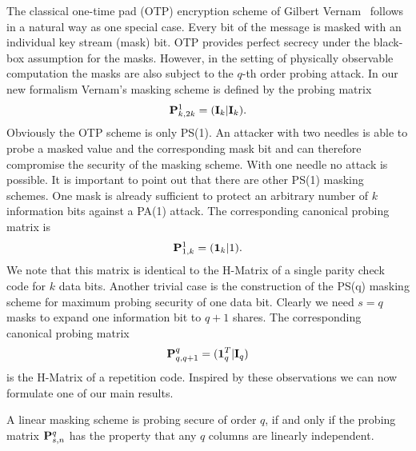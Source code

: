 \documentclass[11pt]{llncs}
\begin{document}
The classical one-time pad (OTP) encryption scheme of
Gilbert Vernam~\cite{Vernam1919SecretSignalingSystem}
follows in a natural way as one special case.
Every bit of the message is masked with an individual key stream (mask) bit.
OTP provides perfect secrecy under the black-box assumption for the masks.
However, in the setting of physically observable computation the masks
are also subject to the $q$-th order probing attack.
In our new formalism Vernam's masking scheme is defined by the probing matrix
\[
    \mathbf{P}^1_{k,2k} = (\mathbf{I}_k | \mathbf{I}_k).
\]
Obviously the OTP scheme is only PS(1).
An attacker with two needles is able to probe a masked value
and the corresponding mask bit and can therefore compromise the
security of the masking scheme. With one needle no attack is possible.
It is important to point out that there are other PS(1) masking schemes.
One mask is already sufficient to protect an arbitrary
number of $k$ information bits against a PA(1) attack.
The corresponding canonical probing matrix is
\[
    \mathbf{P}^1_{1,k} = (\mathbf{1}_k | 1).
\]
We note that this matrix is identical to the H-Matrix of a single
parity check code for $k$ data bits.
Another trivial case is the construction of the PS(q)
masking scheme for maximum probing security of one data bit.
Clearly we need $s = q$ masks to expand one information bit to $q+1$ shares.
The corresponding canonical probing matrix
\[
    \mathbf{P}^q_{q,q+1} = (\mathbf{1}_q^T | \mathbf{I}_q)
\]
is the H-Matrix of a repetition code.
Inspired by these observations we can now formulate one of our main results.
\begin{theorem}\label{Th:ProbingMatrix}
A linear masking scheme is probing secure of order $q$,
if and only if the probing matrix $\mathbf{P}^q_{s,n}$
has the property that any $q$ columns are linearly independent.
\end{theorem}
\end{document}
